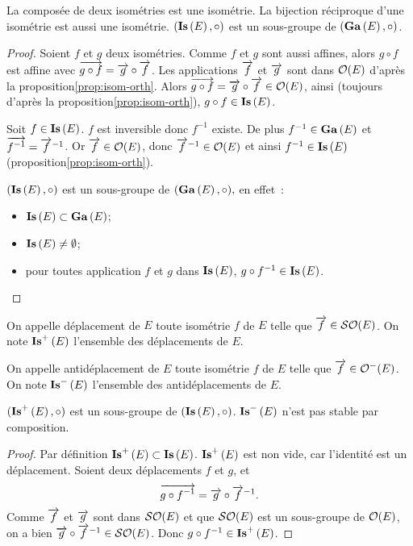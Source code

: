 \begin{prop}
  La composée de deux isométries est une isométrie. La bijection réciproque
  d'une isométrie est aussi une isométrie. \((\mathbf{Is}\left(E\right), \circ)\) est un
  sous-groupe de \((\mathbf{Ga}\left(E\right), \circ)\).
\end{prop}
\begin{proof}
  Soient \(f\) et \(g\) deux isométries. Comme \(f\) et \(g\) sont aussi
  affines, alors \(g \circ f\) est affine avec \(\overrightarrow{g \circ f}=\overrightarrow{g} \circ
  \overrightarrow{f}\). Les applications \(\overrightarrow{f}\) et \(\overrightarrow{g}\) sont dans
  \(\mathcal{O}\!\left(E\right)\) d'après la proposition\ref{prop:isom-orth}. Alors \(\overrightarrow{g \circ f}=\overrightarrow{g} \circ \overrightarrow{f} \in
  \mathcal{O}\!\left(E\right)\), ainsi (toujours d'après la proposition\ref{prop:isom-orth}), \(g \circ f \in \mathbf{Is}\left(E\right)\).

  Soit \(f \in \mathbf{Is}\left(E\right)\). \(f\) est inversible donc \(f^{-1}\) existe. De plus
  \(f^{-1} \in \mathbf{Ga}\left(E\right)\) et \(\overrightarrow{f^{-1}}=\overrightarrow{f}^{-1}\). Or \(\overrightarrow{f} \in
  \mathcal{O}\!\left(E\right)\), donc \(\overrightarrow{f}^{-1} \in \mathcal{O}\!\left(E\right)\) et ainsi \(f^{-1} \in \mathbf{Is}\left(E\right)\)
  (proposition\ref{prop:isom-orth}).

  \((\mathbf{Is}\left(E\right), \circ)\) est un sous-groupe de \((\mathbf{Ga}\left(E\right), \circ),\) en effet~:
  \begin{itemize}
    \item \(\mathbf{Is}\left(E\right) \subset \mathbf{Ga}\left(E\right)\);
    \item \(\mathbf{Is}\left(E\right) \neq \emptyset\);
    \item pour toutes application \(f\) et \(g\) dans \(\mathbf{Is}\left(E\right)\), \(g \circ
      f^{-1} \in \mathbf{Is}\left(E\right)\).
  \end{itemize}
\end{proof}

\begin{defdef}
  On appelle déplacement de \(E\) toute isométrie \(f\) de \(E\) telle que
  \(\overrightarrow{f} \in \mathcal{SO}\!\left(E\right)\). On note \(\mathbf{Is}^{+}\left(E\right)\) l'ensemble des déplacements
  de \(E\).

  On appelle antidéplacement de \(E\) toute isométrie \(f\) de \(E\) telle que
  \(\overrightarrow{f} \in \mathcal{O}^{-}\!\left(E\right)\). On note \(\mathbf{Is}^{-}\left(E\right)\) l'ensemble des
  antidéplacements de \(E\).
\end{defdef}

\begin{prop}
  \((\mathbf{Is}^{+}\left(E\right), \circ)\) est un sous-groupe de \((\mathbf{Is}\left(E\right), \circ)\).
  \(\mathbf{Is}^{-}\left(E\right)\) n'est pas stable par composition.
\end{prop}
\begin{proof}
  Par définition \(\mathbf{Is}^{+}\left(E\right) \subset \mathbf{Is}\left(E\right)\). \(\mathbf{Is}^{+}\left(E\right)\) est non vide, car
  l'identité est un déplacement. Soient deux déplacements \(f\) et \(g\), et
  \begin{equation}
    \overrightarrow{g \circ f^{-1}}=\overrightarrow{g} \circ \overrightarrow{f}^{-1}.
  \end{equation}
  Comme \(\overrightarrow{f}\) et \(\overrightarrow{g}\) sont dans \(\mathcal{SO}\!\left(E\right)\) et que
  \(\mathcal{SO}\!\left(E\right)\) est un sous-groupe de \(\mathcal{O}\!\left(E\right)\), on a bien \(\overrightarrow{g} \circ
  \overrightarrow{f}^{-1} \in \mathcal{SO}\!\left(E\right)\). Donc \(g \circ f^{-1} \in \mathbf{Is}^{+}\left(E\right)\).
\end{proof}

